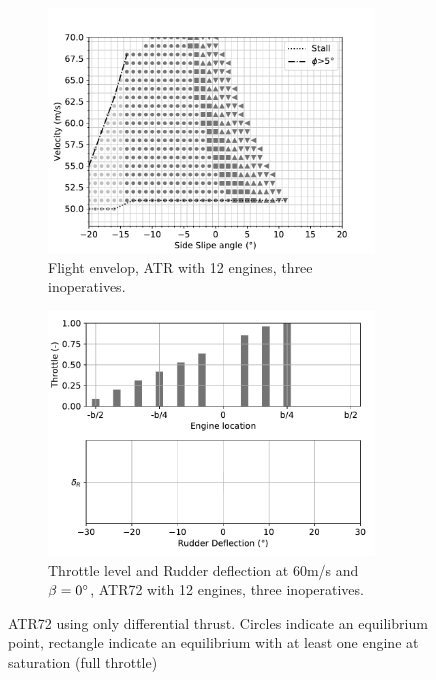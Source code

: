 \begin{figure}[hbt!]
		\centering
		\begin{subfigure}{0.49\textwidth}
			\includegraphics[width=0.95\textwidth]{DEPoriginalMapBetaVelfin1Eng15RudTrue}
			\caption{Flight envelop, ATR with 12 engines, three inoperatives.}
			\label{fig:DEPoriginalfin1_15engine}
		\end{subfigure}
		\begin{subfigure}{0.49\textwidth}
			\includegraphics[width=0.95\textwidth]{DeflDEPoriginalfin1Eng15RudTrue}
			\caption{Throttle level and Rudder deflection at 60m/s and $\beta=0\degree$, ATR72 with 12 engines, three inoperatives.}
			\label{fig:DeflDEPoriginalfin1_15Eng}
		\end{subfigure}
		\caption{ATR72 using only differential thrust. Circles indicate an equilibrium point, rectangle indicate an equilibrium with at least one engine at saturation (full throttle)}
\end{figure}

